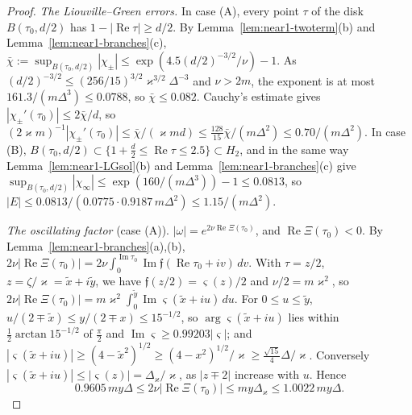 \documentclass[11pt]{amsart}
\theoremstyle{definition}
\theoremstyle{remark}
\numberwithin{equation}{section}
\DeclareMathOperator{\re}{Re}
\DeclareMathOperator{\im}{Im}
\begin{document}
\begin{proof}
\emph{The Liouville--Green errors.} In case (A), every point $\tau$ of the disk $B(\tau_0,d/2)$ has $1-|\re\tau|\ge d/2$. By Lemma~\ref{lem:near1-twoterm}(b) and Lemma~\ref{lem:near1-branches}(c), $\bar\chi:=\sup_{B(\tau_0,d/2)}|\chi_\pm|\le\exp(4.5(d/2)^{-3/2}/\nu)-1$. As $(d/2)^{-3/2}\le(256/15)^{3/2}\varkappa^{3/2}\Delta^{-3}$ and $\nu>2m$, the exponent is at most $161.3/(m\Delta^3)\le0.0788$, so $\bar\chi\le0.082$. Cauchy's estimate gives $|\chi_\pm'(\tau_0)|\le2\bar\chi/d$, so $(2\varkappa m)^{-1}|\chi_\pm'(\tau_0)|\le\bar\chi/(\varkappa md)\le\frac{128}{15}\bar\chi/(m\Delta^2)\le0.70/(m\Delta^2)$. In case (B), $B(\tau_0,d/2)\subset\{1+\frac d2\le\re\tau\le2.5\}\subset H_2$, and in the same way Lemma~\ref{lem:near1-LGsol}(b) and Lemma~\ref{lem:near1-branches}(c) give $\sup_{B(\tau_0,d/2)}|\chi_\infty|\le\exp(160/(m\Delta^3))-1\le0.0813$, so $|E|\le0.0813/(0.0775\cdot0.9187\,m\Delta^2)\le1.15/(m\Delta^2)$.

\emph{The oscillating factor} (case (A)). $|\omega|=e^{2\nu\re\Xi(\tau_0)}$, and $\re\Xi(\tau_0)<0$. By Lemma~\ref{lem:near1-branches}(a),(b), $2\nu|\re\Xi(\tau_0)|=2\nu\int_0^{\im\tau_0}\im\mathfrak f(\re\tau_0+iv)\,dv$. With $\tau=z/2$, $z=\zeta/\varkappa=\tilde x+i\tilde y$, we have $\mathfrak f(z/2)=\varsigma(z)/2$ and $\nu/2=m\varkappa^2$, so $2\nu|\re\Xi(\tau_0)|=m\varkappa^2\int_0^{\tilde y}\im\varsigma(\tilde x+iu)\,du$. For $0\le u\le\tilde y$, $u/(2\mp\tilde x)\le y/(2\mp x)\le15^{-1/2}$, so $\arg\varsigma(\tilde x+iu)$ lies within $\frac12\arctan15^{-1/2}$ of $\frac\pi2$ and $\im\varsigma\ge0.99203|\varsigma|$; and $|\varsigma(\tilde x+iu)|\ge(4-\tilde x^2)^{1/2}\ge(4-x^2)^{1/2}/\varkappa\ge\frac{\sqrt{15}}4\Delta/\varkappa$. Conversely $|\varsigma(\tilde x+iu)|\le|\varsigma(z)|=\Delta_\varkappa/\varkappa$, as $|z\mp2|$ increase with $u$. Hence
\[
0.9605\,my\Delta\le2\nu|\re\Xi(\tau_0)|\le my\Delta_\varkappa\le1.0022\,my\Delta .
\]


\end{proof}
\end{document}
